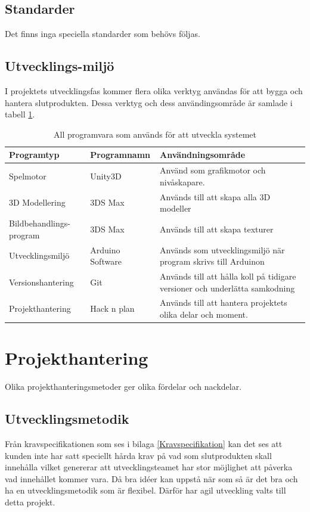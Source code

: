 \documentclass[a4paper,12pt,oneside,final]{extbook}
\begin{document}
\section{Standarder}
Det finns inga speciella standarder som behövs följas.

\section{Utvecklings-miljö}



I projektets utvecklingsfas kommer flera olika verktyg användas för att bygga och hantera slutprodukten. Dessa verktyg och dess användingsområde är samlade i tabell \ref{utvecklingsmiljö}. 


\begin{table}[h]
	\centering
	\caption{All programvara som används för att utveckla systemet}
	\label{utvecklingsmiljö}
	\begin{tabular}{ | p{9em} | m{6em} |p{23em}| } 
		\hline
		\textbf{Programtyp}&\textbf{Programnamn}  &\textbf{ Användningsområde} \\ 
		\hline
		Spelmotor &Unity3D & Använd som grafikmotor och nivåskapare. \\ 
		\hline
		3D Modellering &3DS Max &Används till att skapa alla 3D modeller  \\ 
		\hline
		Bildbehandlings-program &3DS Max &Används till att skapa texturer  \\ 
		\hline
		Utvecklingsmiljö &Arduino Software &Används som utvecklingsmiljö när program skrivs till Arduinon  \\ 
		\hline
		Versionshantering &Git &Används till att hålla koll på tidigare versioner och underlätta samkodning  \\ 
		\hline
		Projekthantering &Hack n plan &Används till att hantera projektets olika delar och moment.  \\ 
		\hline

	\end{tabular}
\end{table}

	



\chapter{Projekthantering}

Olika projekthanteringsmetoder ger olika fördelar och nackdelar.

\section{Utvecklingsmetodik}
Från kravspecifikationen som ses i bilaga \ref{Kravspecifikation} kan det ses att kunden inte har satt speciellt hårda krav på vad som slutprodukten skall innehålla vilket genererar att utvecklingsteamet har stor möjlighet att påverka vad innehållet kommer vara. Då bra idéer kan uppstå när som så är det bra och ha en utvecklingsmetodik som är flexibel. Därför har agil utveckling valts till detta projekt.
\end{document}

